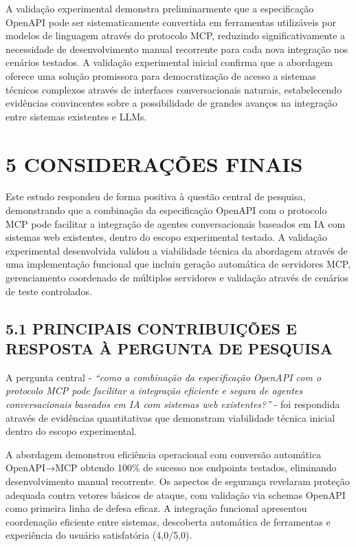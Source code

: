 \documentclass[
]{article}
\begin{document}
A validação experimental demonstra preliminarmente que a especificação
OpenAPI pode ser sistematicamente convertida em ferramentas utilizáveis
por modelos de linguagem através do protocolo MCP, reduzindo
significativamente a necessidade de desenvolvimento manual recorrente
para cada nova integração nos cenários testados. A validação
experimental inicial confirma que a abordagem oferece uma solução
promissora para democratização de acesso a sistemas técnicos complexos
através de interfaces conversacionais naturais, estabelecendo evidências
convincentes sobre a possibilidade de grandes avanços na integração
entre sistemas existentes e LLMs.

\section{5 CONSIDERAÇÕES FINAIS}\label{considerauxe7uxf5es-finais}

Este estudo respondeu de forma positiva à questão central de pesquisa,
demonstrando que a combinação da especificação OpenAPI com o protocolo
MCP pode facilitar a integração de agentes conversacionais baseados em
IA com sistemas web existentes, dentro do escopo experimental testado. A
validação experimental desenvolvida validou a viabilidade técnica da
abordagem através de uma implementação funcional que incluiu geração
automática de servidores MCP, gerenciamento coordenado de múltiplos
servidores e validação através de cenários de teste controlados.

\subsection{5.1 PRINCIPAIS CONTRIBUIÇÕES E RESPOSTA À PERGUNTA DE
PESQUISA}\label{principais-contribuiuxe7uxf5es-e-resposta-uxe0-pergunta-de-pesquisa}

A pergunta central - \emph{``como a combinação da especificação OpenAPI
com o protocolo MCP pode facilitar a integração eficiente e segura de
agentes conversacionais baseados em IA com sistemas web existentes?''} -
foi respondida através de evidências quantitativas que demonstram
viabilidade técnica inicial dentro do escopo experimental.

A abordagem demonstrou eficiência operacional com conversão automática
OpenAPI→MCP obtendo 100\% de sucesso nos endpoints testados, eliminando
desenvolvimento manual recorrente. Os aspectos de segurança revelaram
proteção adequada contra vetores básicos de ataque, com validação via
schemas OpenAPI como primeira linha de defesa eficaz. A integração
funcional apresentou coordenação eficiente entre sistemas, descoberta
automática de ferramentas e experiência do usuário satisfatória
(4,0/5,0).
\end{document}

